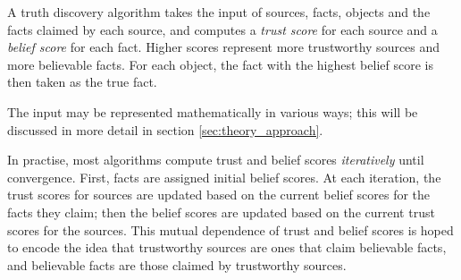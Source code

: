 \documentclass[../main.tex]{subfiles}
\begin{document}

A truth discovery algorithm takes the input of sources, facts, objects and the
facts claimed by each source, and computes a \emph{trust score} for each source
and a \emph{belief score} for each fact. Higher scores represent more
trustworthy sources and more believable facts\footnotemark{}. For each object,
the fact with the highest belief score is then taken as the true fact.


The input may be represented mathematically in various ways; this will be
discussed in more detail in section \ref{sec:theory_approach}. 

In practise, most algorithms compute trust and belief scores \emph{iteratively}
until convergence. First, facts are assigned initial belief scores. At each
iteration, the trust scores for sources are updated based on the current belief
scores for the facts they claim; then the belief scores are updated based on the
current trust scores for the sources. This mutual dependence of trust and
belief scores is hoped to encode the idea that trustworthy sources are ones
that claim believable facts, and believable facts are those claimed by
trustworthy sources.
\end{document}
